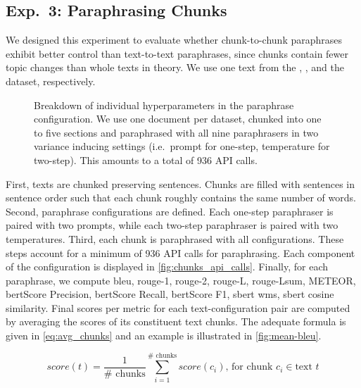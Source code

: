 \subsection{Exp.\ 3: Paraphrasing Chunks}
\label{subsec:paraphrasing_chunks}

We designed this experiment to evaluate whether chunk-to-chunk paraphrases exhibit better control than text-to-text paraphrases, since chunks contain fewer topic changes than whole texts in theory.
We use one text from the \dataBlog{}, \dataGutenberg{}, and the \dataStudent{} dataset, respectively.


\begin{figure}[htbp]
  \centering
  
  \caption[Paraphrase configuration hyperparameters.]{Breakdown of individual hyperparameters in the paraphrase configuration.
  We use one document per dataset, chunked into one to five sections and paraphrased with all nine paraphrasers in two variance inducing settings (i.e.\ prompt for one-step, temperature for two-step).
  This amounts to a total of 936 API calls. 
  }
  \label{fig:chunks_api_calls}
\end{figure}


First, texts are chunked preserving sentences.
Chunks are filled with sentences in sentence order such that each chunk roughly contains the same number of words.
Second, paraphrase configurations are defined.
Each one-step paraphraser is paired with two prompts, while each two-step paraphraser is paired with two temperatures.
Third, each chunk is paraphrased with all configurations.
These steps account for a minimum of 936 API calls for paraphrasing.
Each component of the configuration is displayed in \autoref{fig:chunks_api_calls}.
Finally, for each paraphrase, we compute \ac{bleu}, \ac{rouge}-1, \ac{rouge}-2, \ac{rouge}-L, \ac{rouge}-Lsum, METEOR, \ac{bert}\-Score Precision, \ac{bert}\-Score Recall, \ac{bert}\-Score F1, \ac{sbert} \ac{wms}, \ac{sbert} cosine similarity.
Final scores per metric for each text-configuration pair are computed by averaging the scores of its constituent text chunks.
The adequate formula is given in \autoref{eq:avg_chunks} and an example is illustrated in \autoref{fig:mean-bleu}.

\begin{equation}
    score(t) = \frac{1}{\#\text{ chunks}}\sum_{i=1}^{\#\text{ chunks}}score(c_i)\text{, for chunk }c_i \in \text{text }t
\label{eq:avg_chunks}
\end{equation}

